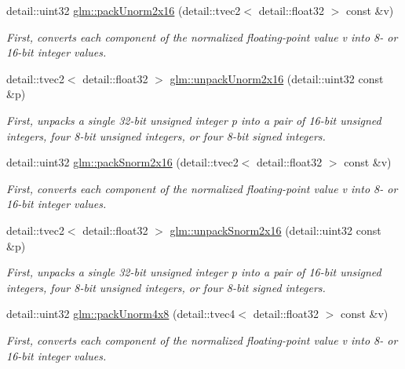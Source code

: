 \begin{DoxyCompactItemize}
\item 
detail\-::uint32 \hyperlink{group__core__func__packing_ga38cc970d20075fda38a1725f668ec1e3}{glm\-::pack\-Unorm2x16} (detail\-::tvec2$<$ detail\-::float32 $>$ const \&v)
\begin{DoxyCompactList}\small\item\em First, converts each component of the normalized floating-\/point value v into 8-\/ or 16-\/bit integer values. \end{DoxyCompactList}\item 
detail\-::tvec2$<$ detail\-::float32 $>$ \hyperlink{group__core__func__packing_gaa0b6b63ebe8cd5899b277bce84237ad1}{glm\-::unpack\-Unorm2x16} (detail\-::uint32 const \&p)
\begin{DoxyCompactList}\small\item\em First, unpacks a single 32-\/bit unsigned integer p into a pair of 16-\/bit unsigned integers, four 8-\/bit unsigned integers, or four 8-\/bit signed integers. \end{DoxyCompactList}\item 
detail\-::uint32 \hyperlink{group__core__func__packing_ga25db573698cb49ea4c4ef96bfcebecf3}{glm\-::pack\-Snorm2x16} (detail\-::tvec2$<$ detail\-::float32 $>$ const \&v)
\begin{DoxyCompactList}\small\item\em First, converts each component of the normalized floating-\/point value v into 8-\/ or 16-\/bit integer values. \end{DoxyCompactList}\item 
detail\-::tvec2$<$ detail\-::float32 $>$ \hyperlink{group__core__func__packing_gafeb2843ce77c028f30ef5acb02e7aa2c}{glm\-::unpack\-Snorm2x16} (detail\-::uint32 const \&p)
\begin{DoxyCompactList}\small\item\em First, unpacks a single 32-\/bit unsigned integer p into a pair of 16-\/bit unsigned integers, four 8-\/bit unsigned integers, or four 8-\/bit signed integers. \end{DoxyCompactList}\item 
detail\-::uint32 \hyperlink{group__core__func__packing_ga4b10d27c4f1f5be5936b49ccc0d661ec}{glm\-::pack\-Unorm4x8} (detail\-::tvec4$<$ detail\-::float32 $>$ const \&v)
\begin{DoxyCompactList}\small\item\em First, converts each component of the normalized floating-\/point value v into 8-\/ or 16-\/bit integer values. \end{DoxyCompactList}\item 

\end{DoxyCompactItemize}
